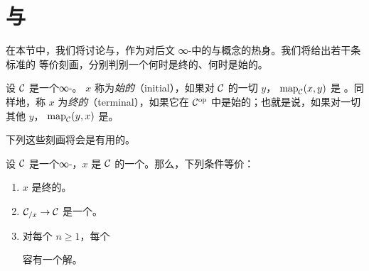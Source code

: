 \section{\trTerminalObject{}与\trInitialObject{}}
\label{sec:terminal-initial-objects}

在本节中，我们将讨论\trTerminalObject{}与\trInitialObject{}，作为对后文
∞-\trCategories{}中的\trLimit{}与\trColimit{}概念的热身。我们将给出若干条标准的
等价刻画，分别判别一个\trObject{}何时是终的、何时是始的。

\begin{definition}\label{def:initial-terminal}
设 $\mathcal{C}$ 是一个∞-\trCategory{}。\trObject{} $x$ 称为\emph{始的}（initial），如果对
$\mathcal{C}$ 的一切\trObject{} $y$，\trMappingSpace{} $\mathrm{map}_{\mathcal{C}}(x, y)$ 是%
\trContractible{}。同样地，称 $x$ 为\emph{终的}（terminal），如果它在
$\mathcal{C}^{\mathrm{op}}$ 中是始的；也就是说，如果对一切其他\trObject{} $y$，
\trMappingSpace{} $\mathrm{map}_{\mathcal{C}}(y, x)$ 是\trContractible{}。
\end{definition}

下列这些刻画将会是有用的。

\begin{lemma}\label{lem:terminal-characterizations}
设 $\mathcal{C}$ 是一个∞-\trCategory{}，$x$ 是 $\mathcal{C}$ 的一个\trObject{}。那么，下列条件等价：
\begin{enumerate}[label=(\arabic*)]
  \item $x$ 是终的。
  \item \trFunctor{} $\mathcal{C}_{/x} \to \mathcal{C}$ 是一个\trTrivialFibration{}。
  \item 对每个 $n \ge 1$，每个\trLiftingProblem{}%
\begin{center}
\end{center}
容有一个解。
\end{enumerate}
\end{lemma}

